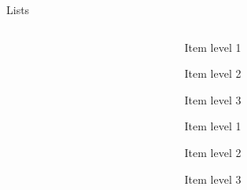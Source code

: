 \documentclass[aspectratio=169]{beamer}
\begin{document}
\begin{frame}{Lists}
\begin{columns}
\begin{column}{0.49\textwidth}
        \end{column}
        \begin{column}{0.49\textwidth}
            \begin{coloredblock}
                \vspace{0.5cm}
                \begin{tugromanenumerate}
                    \item Item level 1
                    \begin{tugromanenumerate}
                        \item Item level 2
                        \begin{tugromanenumerate}
                            \item Item level 3
                        \end{tugromanenumerate}
                    \end{tugromanenumerate}
                \end{tugromanenumerate}
            \end{coloredblock}
    
            \begin{coloredblock}
                    \begin{boxromanenumerate}
                        \item Item level 1
                        \begin{boxromanenumerate}
                            \item Item level 2
                            \begin{boxromanenumerate}
                                \item Item level 3
                            \end{boxromanenumerate}
                        \end{boxromanenumerate}
                    \end{boxromanenumerate}
            \end{coloredblock}
        \end{column}
    \end{columns}
\end{frame}


\end{document}
